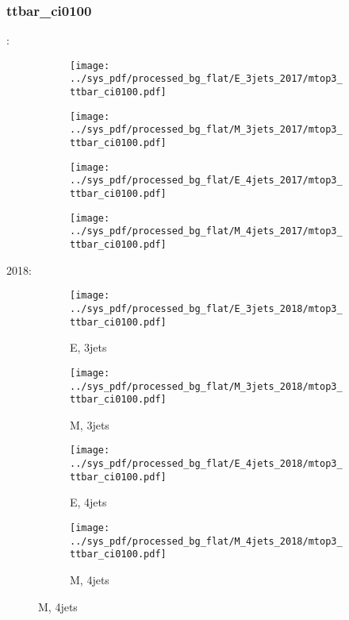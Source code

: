 \documentclass{beamer}
\begin{document}
\begin{frame}
\frametitle{ttbar_ci0100}
\fontsize{5}{1}:
\begin{figure}
\centering
\begin{subfigure}[b]{0.24\textwidth}
\texttt{[image: ../sys\_pdf/processed\_bg\_flat/E\_3jets\_2017/mtop3\_ttbar\_ci0100.pdf]}
\end{subfigure}
\begin{subfigure}[b]{0.24\textwidth}
\texttt{[image: ../sys\_pdf/processed\_bg\_flat/M\_3jets\_2017/mtop3\_ttbar\_ci0100.pdf]}
\end{subfigure}
\begin{subfigure}[b]{0.24\textwidth}
\texttt{[image: ../sys\_pdf/processed\_bg\_flat/E\_4jets\_2017/mtop3\_ttbar\_ci0100.pdf]}
\end{subfigure}
\begin{subfigure}[b]{0.24\textwidth}
\texttt{[image: ../sys\_pdf/processed\_bg\_flat/M\_4jets\_2017/mtop3\_ttbar\_ci0100.pdf]}
\end{subfigure}
\end{figure}
2018:
\begin{figure}
\centering
\begin{subfigure}[b]{0.24\textwidth}
\texttt{[image: ../sys\_pdf/processed\_bg\_flat/E\_3jets\_2018/mtop3\_ttbar\_ci0100.pdf]}
\captionsetup{font=tiny}
\caption{E, 3jets}
\end{subfigure}
\begin{subfigure}[b]{0.24\textwidth}
\texttt{[image: ../sys\_pdf/processed\_bg\_flat/M\_3jets\_2018/mtop3\_ttbar\_ci0100.pdf]}
\captionsetup{font=tiny}
\caption{M, 3jets}
\end{subfigure}
\begin{subfigure}[b]{0.24\textwidth}
\texttt{[image: ../sys\_pdf/processed\_bg\_flat/E\_4jets\_2018/mtop3\_ttbar\_ci0100.pdf]}
\captionsetup{font=tiny}
\caption{E, 4jets}
\end{subfigure}
\begin{subfigure}[b]{0.24\textwidth}
\texttt{[image: ../sys\_pdf/processed\_bg\_flat/M\_4jets\_2018/mtop3\_ttbar\_ci0100.pdf]}
\captionsetup{font=tiny}
\caption{M, 4jets}
\end{subfigure}
\end{figure}
\end{frame}
\end{document}
